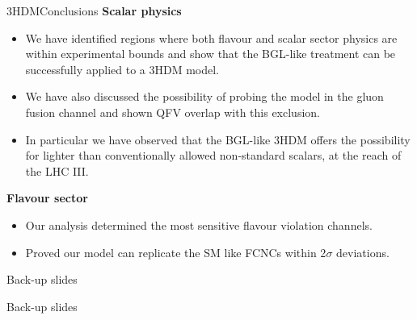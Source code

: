 \documentclass[10pt,xcolor=dvipsnames,mathserif]{beamer}
\begin{document}

\begin{frame}{3HDM}{Conclusions}
    \textbf{Scalar physics}
    \begin{itemize}
        \item  We have identified regions where both flavour and scalar sector physics are within experimental bounds and show that the BGL-like treatment can be successfully applied to a 3HDM model. 
        \item  We have also discussed the possibility of probing the model in the gluon fusion channel and shown QFV overlap with this exclusion. 
        \item  In particular we have observed that the BGL-like 3HDM offers the possibility for lighter than conventionally allowed non-standard scalars, at the reach of the LHC III.
    \end{itemize}
    \textbf{Flavour sector}
    \begin{itemize}
        \item Our analysis determined the most sensitive flavour violation channels. 
        \item Proved our model can replicate the SM like FCNCs within 2$\sigma$ deviations.
    \end{itemize}
\end{frame}

\appendix
\begin{frame}{Back-up slides}
    \begin{center}
        \Huge Back-up slides
    \end{center}
\end{frame}
\end{document}
